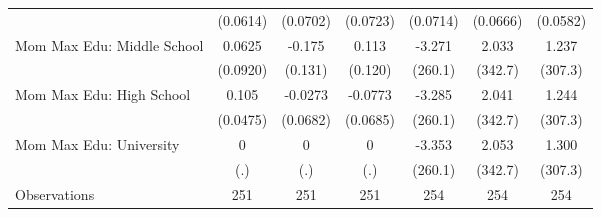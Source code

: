 {\begin{tabular}{l*{6}{c}}
                    &    (0.0614)         &    (0.0702)         &    (0.0723)         &    (0.0714)         &    (0.0666)         &    (0.0582)         \\
\addlinespace
Mom Max Edu: Middle School&      0.0625         &      -0.175         &       0.113         &      -3.271         &       2.033         &       1.237         \\
                    &    (0.0920)         &     (0.131)         &     (0.120)         &     (260.1)         &     (342.7)         &     (307.3)         \\
\addlinespace
Mom Max Edu: High School&       0.105\sym{*}  &     -0.0273         &     -0.0773         &      -3.285         &       2.041         &       1.244         \\
                    &    (0.0475)         &    (0.0682)         &    (0.0685)         &     (260.1)         &     (342.7)         &     (307.3)         \\
\addlinespace
Mom Max Edu: University&           0         &           0         &           0         &      -3.353         &       2.053         &       1.300         \\
                    &         (.)         &         (.)         &         (.)         &     (260.1)         &     (342.7)         &     (307.3)         \\
\midrule
Observations        &         251         &         251         &         251         &         254         &         254         &         254         \\
\bottomrule
\end{tabular}
}
